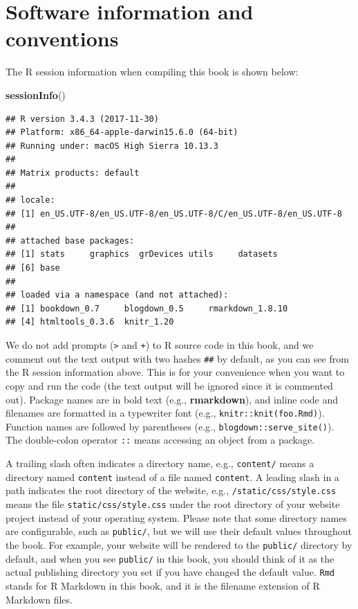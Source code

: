 \documentclass[12pt,]{krantz}
\makeatletter
\newenvironment{Shaded}{\begin{snugshade}}{\end{snugshade}}
\newcommand{\KeywordTok}[1]{\textcolor[rgb]{0.13,0.29,0.53}{\textbf{#1}}}
\newcommand{\NormalTok}[1]{#1}
\newenvironment{kframe}{%
\medskip{}
\setlength{\fboxsep}{.8em}
 \def\at@end@of@kframe{}%
 \ifinner\ifhmode%
  \def\at@end@of@kframe{\end{minipage}}%
  \begin{minipage}{\columnwidth}%
 \fi\fi%
 \def\FrameCommand##1{\hskip\@totalleftmargin \hskip-\fboxsep
 \colorbox{shadecolor}{##1}\hskip-\fboxsep
     \hskip-\linewidth \hskip-\@totalleftmargin \hskip\columnwidth}%
 \MakeFramed {\advance\hsize-\width
   \@totalleftmargin\z@ \linewidth\hsize
   \@setminipage}}%
 {\par\unskip\endMakeFramed%
 \at@end@of@kframe}
\renewenvironment{Shaded}{\begin{kframe}}{\end{kframe}}
\theoremstyle{definition}
\theoremstyle{definition}
\theoremstyle{definition}
\theoremstyle{remark}
\makeatother
\begin{document}
\section*{Software information and conventions}\label{software-info}


The R session information when compiling this book is shown below:

\begin{Shaded}
\begin{Highlighting}[]
\KeywordTok{sessionInfo}\NormalTok{()}
\end{Highlighting}
\end{Shaded}

\begin{verbatim}
## R version 3.4.3 (2017-11-30)
## Platform: x86_64-apple-darwin15.6.0 (64-bit)
## Running under: macOS High Sierra 10.13.3
## 
## Matrix products: default
## 
## locale:
## [1] en_US.UTF-8/en_US.UTF-8/en_US.UTF-8/C/en_US.UTF-8/en_US.UTF-8
## 
## attached base packages:
## [1] stats     graphics  grDevices utils     datasets 
## [6] base     
## 
## loaded via a namespace (and not attached):
## [1] bookdown_0.7     blogdown_0.5     rmarkdown_1.8.10
## [4] htmltools_0.3.6  knitr_1.20
\end{verbatim}

We do not add prompts (\texttt{\textgreater{}} and \texttt{+}) to R
source code in this book, and we comment out the text output with two
hashes \texttt{\#\#} by default, as you can see from the R session
information above. This is for your convenience when you want to copy
and run the code (the text output will be ignored since it is commented
out). Package names are in bold text (e.g., \textbf{rmarkdown}), and
inline code and filenames are formatted in a typewriter font (e.g.,
\texttt{knitr::knit(\textquotesingle{}foo.Rmd\textquotesingle{})}).
Function names are followed by parentheses (e.g.,
\texttt{blogdown::serve\_site()}). The double-colon operator \texttt{::}
means accessing an object from a package.

A trailing slash often indicates a directory name, e.g.,
\texttt{content/} means a directory named \texttt{content} instead of a
file named \texttt{content}. A leading slash in a path indicates the
root directory of the website, e.g., \texttt{/static/css/style.css}
means the file \texttt{static/css/style.css} under the root directory of
your website project instead of your operating system. Please note that
some directory names are configurable, such as \texttt{public/}, but we
will use their default values throughout the book. For example, your
website will be rendered to the \texttt{public/} directory by default,
and when you see \texttt{public/} in this book, you should think of it
as the actual publishing directory you set if you have changed the
default value. \texttt{Rmd} stands for R Markdown in this book, and it
is the filename extension of R Markdown files.
\end{document}
